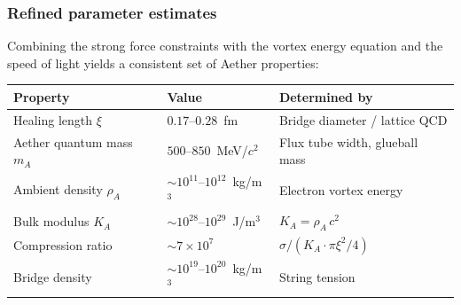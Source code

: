 ﻿\documentclass[12pt,letterpaper]{article}
\newcommand{\rhoa}{\rho_{\!A}}
\newcommand{\Ka}{K_{\!A}}
\begin{document}
\subsubsection*{Refined parameter estimates}

Combining the strong force constraints with the vortex energy equation and the
speed of light yields a consistent set of Aether properties:
%
\begin{center}
\begin{tabular}{@{}lll@{}}
\hline
\textbf{Property} & \textbf{Value} & \textbf{Determined by} \\
\hline
Healing length $\xi$       & $0.17$--$0.28$~fm     & Bridge diameter / lattice QCD \\
Aether quantum mass $m_A$  & $500$--$850$~MeV/$c^2$  & Flux tube width, glueball mass \\
Ambient density $\rhoa$    & $\sim 10^{11}$--$10^{12}$~kg/m$^3$ & Electron vortex energy \\
Bulk modulus $\Ka$          & $\sim 10^{28}$--$10^{29}$~J/m$^3$  & $\Ka = \rhoa\,c^2$ \\
Compression ratio          & $\sim 7 \times 10^{7}$         & $\sigma / (\Ka \cdot \pi\xi^2/4)$ \\
Bridge density              & $\sim 10^{19}$--$10^{20}$~kg/m$^3$ & String tension \\
\hline
\end{tabular}
\end{center}
\end{document}
